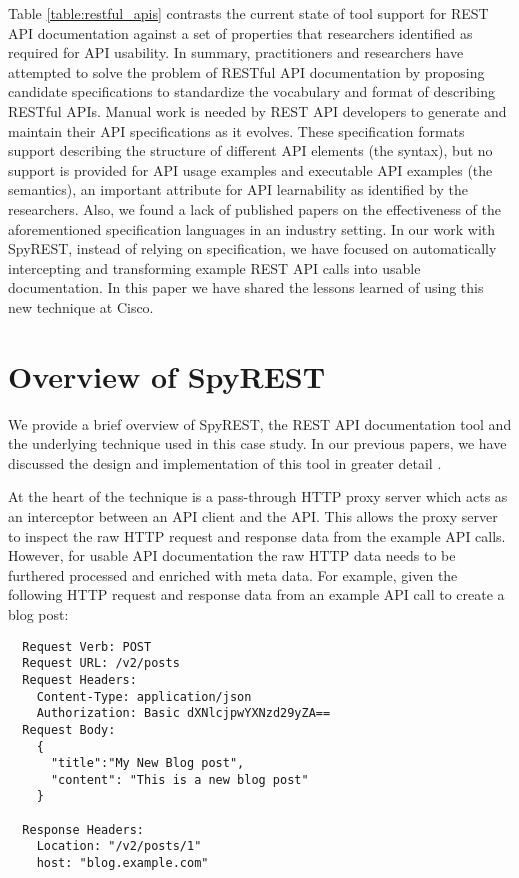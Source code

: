 \documentclass[10pt, conference]{IEEEtran}
\begin{document}
Table \ref{table:restful_apis} contrasts the current state of tool support for REST API documentation against a set of properties that researchers identified as required for API usability. In summary, practitioners and researchers have attempted to solve the problem of RESTful API documentation by proposing candidate specifications to standardize the vocabulary and format of describing RESTful APIs. Manual work is needed by REST API developers to generate and maintain their API specifications as it evolves. These specification formats support describing the structure of different API elements (the syntax), but no support is provided for API usage examples and executable API examples (the semantics), an important attribute for API learnability as identified by the researchers. Also, we found a lack of published papers on the effectiveness of the aforementioned specification languages in an industry setting. In our work with SpyREST, instead of relying on specification, we have focused on automatically intercepting and transforming example REST API calls into usable documentation. In this paper we have shared the lessons learned of using this new technique at Cisco.

\section{Overview of SpyREST} %
\label{sec:overview}
We provide a brief overview of SpyREST, the REST API documentation tool and the underlying technique used in this case study. In our previous papers, we have discussed the design and implementation of this tool in greater detail \cite{DBLP:conf/kbse/SohanAM15}.

At the heart of the technique is a pass-through HTTP proxy server which acts as an interceptor between an API client and the API. This allows the proxy server to inspect the raw HTTP request and response data from the example API calls. However, for usable API documentation the raw HTTP data needs to be furthered processed and enriched with meta data. For example, given the following HTTP request and response data from an example API call to create a blog post:
\begin{lstlisting}
  Request Verb: POST
  Request URL: /v2/posts
  Request Headers:
    Content-Type: application/json
    Authorization: Basic dXNlcjpwYXNzd29yZA==
  Request Body:
    {
      "title":"My New Blog post",
      "content": "This is a new blog post"
    }

  Response Headers:
    Location: "/v2/posts/1"
    host: "blog.example.com"

\end{lstlisting}
\end{document}
